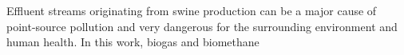 Effluent streams originating from swine production can be a major cause of point-source pollution and very dangerous for the surrounding environment and human health. In this work, biogas and biomethane 